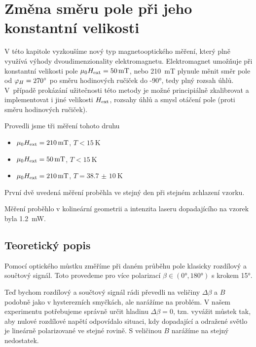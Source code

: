 \chapter{Změna směru pole při jeho konstantní velikosti} \label{kap_toceni}

V této kapitole vyzkoušíme nový typ magnetooptického měření, který plně využívá výhody dvoudimenzionality elektromagnetu. Elektromagnet umožňuje při konstantní velikosti pole $\mu_0 H_\text{ext}=\SI{50}{\milli\tesla}$, nebo \SI{210}{\milli\tesla} plynule měnit směr pole od $\varphi_H=\ang{270}$ po směru hodinových ručiček do \ang{-90}, tedy plný rozsah úhlů. V~případě prokázání užitečnosti této metody je možné principiálně zkalibrovat a implementovat i jiné velikosti $H_\text{ext}$, rozsahy úhlů a smysl otáčení pole (proti směru hodinových ručiček).

Provedli jsme tři měření tohoto druhu
\begin{itemize}
	\item $\mu_0 H_\text{ext}=\SI{210}{\milli\tesla}$, $T<\SI{15}{\kelvin}$
	\item $\mu_0 H_\text{ext}=\SI{50}{\milli\tesla}$, $T<\SI{15}{\kelvin}$
	\item $\mu_0 H_\text{ext}=\SI{210}{\milli\tesla}$, $T=\SI{38,7(10)}{\kelvin}$
\end{itemize}
První dvě uvedená měření proběhla ve stejný den při stejném zchlazení vzorku.

Měření proběhlo v kolineární geometrii a intenzita laseru dopadajícího na vzorek byla \SI{1,2}{\milli\watt}.



\section{Teoretický popis}
Pomocí optického můstku změříme při daném průběhu pole klasicky rozdílový a součtový signál. Toto provedeme pro více polarizací $\beta \in (\ang{0}, \ang{180})$ s krokem \ang{15}.

Teď bychom rozdílový a součtový signál rádi převedli na veličiny $\Delta \beta$ a $B$ podobně jako v hysterezních smyčkách, ale narážíme na problém. V našem experimentu potřebujeme správně určit hladinu $\Delta \beta=0$, tzn. vyvážit můstek tak, aby nulové rozdílové napětí odpovídalo situaci, kdy dopadající a odražené světlo je lineárně polarizované ve stejné rovině. S veličinou $B$ narážíme na stejný nedostatek. 

